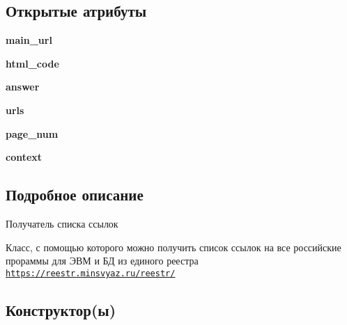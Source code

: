 \subsection*{Открытые атрибуты}
\begin{DoxyCompactItemize}
\item 
\mbox{\label{classUrlsReceiver_1_1UrlsReceiver_a26ea003c345156c0e7cdeb49750b15f2}} 
{\bfseries main\+\_\+url}
\item 
\mbox{\label{classUrlsReceiver_1_1UrlsReceiver_a4a9800032de527abd7fbc8dfed704d53}} 
{\bfseries html\+\_\+code}
\item 
\mbox{\label{classUrlsReceiver_1_1UrlsReceiver_afd8cf89e02fd746d77d6074eeacaec0e}} 
{\bfseries answer}
\item 
\mbox{\label{classUrlsReceiver_1_1UrlsReceiver_aa118829b177026eba1f6701b7178fbfb}} 
{\bfseries urls}
\item 
\mbox{\label{classUrlsReceiver_1_1UrlsReceiver_af9f409bb62f37a08c7fc7eb37e07dd2a}} 
{\bfseries page\+\_\+num}
\item 
\mbox{\label{classUrlsReceiver_1_1UrlsReceiver_ad10c955c9e74df17b8f5f9cc6a80a5e7}} 
{\bfseries context}
\end{DoxyCompactItemize}


\subsection{Подробное описание}
Получатель списка ссылок 

Класс, с помощью которого можно получить список ссылок на все российские прораммы для ЭВМ и БД из единого реестра {\ttfamily \href{https://reestr.minsvyaz.ru/reestr/}{\tt https\+://reestr.\+minsvyaz.\+ru/reestr/}} 

\subsection{Конструктор(ы)}
\mbox{\label{classUrlsReceiver_1_1UrlsReceiver_ae4ba1b935dce3bd30912583beca32aff}} 
